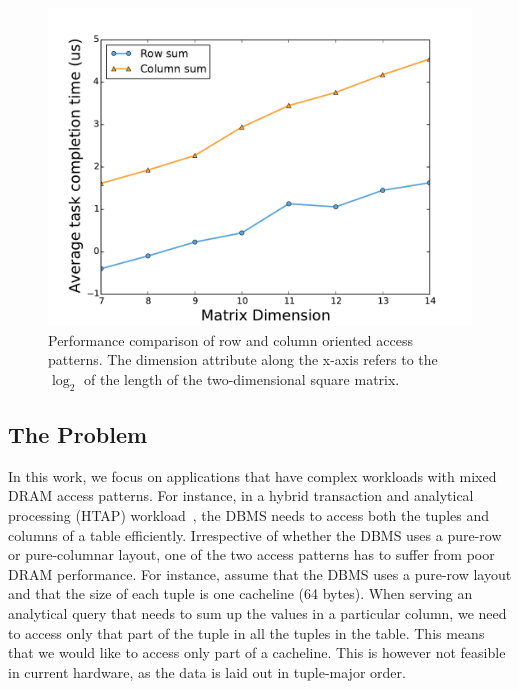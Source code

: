 \documentclass[letterpaper]{article}
\begin{document}
\begin{figure}[ht]
	\centering
	\includegraphics[scale=0.35]{images/rowmajor}
	\caption{Performance comparison of row and column oriented access patterns.
	The dimension attribute along the x-axis refers to the $\log_2$ of
	the length of the two-dimensional square matrix. }
	\label{fig:perf}
\end{figure}

\subsection{The Problem}

In this work, we focus on applications that have complex workloads with
mixed DRAM access patterns. For instance, in a hybrid transaction and
analytical processing (HTAP) workload~\cite{grund10}, the DBMS needs to 
access both the tuples and columns of a table efficiently. Irrespective of
whether the DBMS uses a pure-row or pure-columnar layout, one of the two
access patterns has to suffer from poor DRAM performance. For instance, assume
that the DBMS uses a pure-row layout and that the size of each tuple is one
cacheline (64 bytes). 
When serving an analytical query that needs to sum up the values in a
particular column, we need to access only that part of the tuple 
in all the tuples in the table. 
This means that we would like to access only part of a cacheline.
This is however not feasible in current hardware, as the data is laid
out in tuple-major order.  
\end{document}
